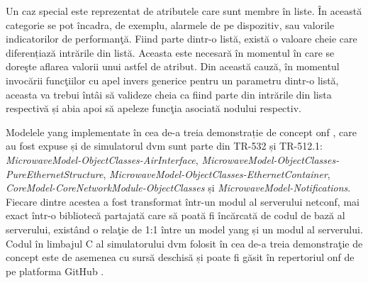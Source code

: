 Un caz special este reprezentat de atributele care sunt membre în liste. În această categorie se pot încadra, de exemplu, alarmele de pe dispozitiv, sau valorile indicatorilor de performanţă. Fiind parte dintr-o listă, există o valoare cheie care diferențiază intrările din listă. Aceasta este necesară în momentul în care se doreşte aflarea valorii unui astfel de atribut. Din această cauză, în momentul invocării funcţiilor cu apel invers generice pentru un parametru dintr-o listă, aceasta va trebui întâi să valideze cheia ca fiind parte din intrările din lista respectivă și abia apoi să apeleze funcţia asociată nodului respectiv.

Modelele \gls{yang} implementate în cea de-a treia demonstrație de concept \gls{onf} \cite{onf2016_poc3}, care au fost expuse și de simulatorul \gls{dvm} sunt parte din TR-532 și TR-512.1: \textit{MicrowaveModel-ObjectClasses-AirInterface}, \textit{MicrowaveModel-ObjectClasses-PureEthernetStructure}, \textit{MicrowaveModel-ObjectClasses-EthernetContainer}, \textit{CoreModel-CoreNetworkModule-ObjectClasses} și \textit{MicrowaveModel-Notifications}. Fiecare dintre acestea a fost transformat într-un modul al serverului \gls{netconf}, mai exact într-o bibliotecă partajată care să poată fi încărcată de codul de bază al serverului, existând o relaţie de 1:1 între un model \gls{yang} și un modul al serverului. Codul în limbajul C al simulatorului \gls{dvm} folosit în cea de-a treia demonstraţie de concept este de asemenea cu sursă deschisă și poate fi găsit în repertoriul \gls{onf} de pe platforma GitHub \cite{dvmv02github}.

